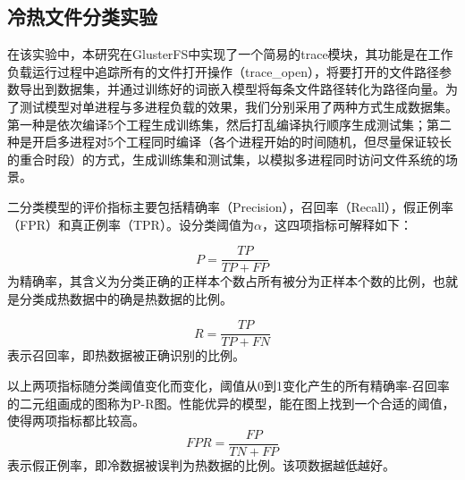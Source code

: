 \subsection{冷热文件分类实验}
在该实验中，本研究在GlusterFS中实现了一个简易的trace模块，其功能是在工作负载运行过程中追踪所有的文件打开操作（trace\_open），将要打开的文件路径参数导出到数据集，并通过训练好的词嵌入模型将每条文件路径转化为路径向量。为了测试模型对单进程与多进程负载的效果，我们分别采用了两种方式生成数据集。第一种是依次编译5个工程生成训练集，然后打乱编译执行顺序生成测试集；第二种是开启多进程对5个工程同时编译（各个进程开始的时间随机，但尽量保证较长的重合时段）的方式，生成训练集和测试集，以模拟多进程同时访问文件系统的场景。

二分类模型的评价指标主要包括精确率（Precision），召回率（Recall），假正例率（FPR）和真正例率（TPR）。设分类阈值为$\alpha$，这四项指标可解释如下：

\begin{equation}
    P = \frac{TP}{TP + FP}
\end{equation}
为精确率，其含义为分类正确的正样本个数占所有被分为正样本个数的比例，也就是分类成热数据中的确是热数据的比例。%

\begin{equation}
    R = \frac{TP}{TP + FN}
\end{equation}
表示召回率，即热数据被正确识别的比例。%

以上两项指标随分类阈值变化而变化，阈值从0到1变化产生的所有精确率-召回率的二元组画成的图称为P-R图。性能优异的模型，能在图上找到一个合适的阈值，使得两项指标都比较高。
\begin{equation}
    FPR = \frac{FP}{TN+FP}
\end{equation}
表示假正例率，即冷数据被误判为热数据的比例。该项数据越低越好。

